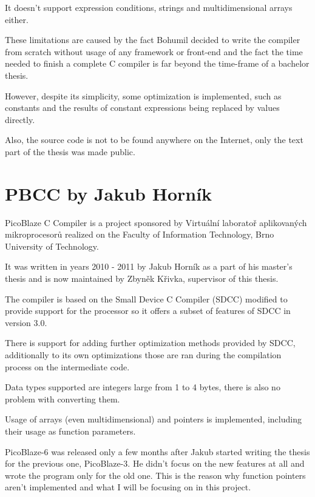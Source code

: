     It doesn't support expression conditions, strings and multidimensional arrays either.

    These limitations are caused by the fact Bohumil decided to write the compiler
    from scratch without usage of any framework or front-end and the fact the time needed to finish a complete C compiler is far beyond the time-frame of a bachelor thesis.

    However, despite its simplicity, some optimization is implemented, 
    such as constants and the results of constant expressions being replaced by values directly.

    Also, the source code is not to be found anywhere on the Internet, only the text part of the thesis was made public.


    \section{PBCC by Jakub Horník}\label{prev_pbcc}


    PicoBlaze C Compiler is a project sponsored by Virtuální laboratoř aplikovaných mikroprocesorů 
    realized on the Faculty of Information Technology, Brno University of Technology.

    It was written in years 2010 - 2011 by Jakub Horník as a part of his master's thesis and is now maintained by Zbyněk Křivka, supervisor of this thesis.

    The compiler is based on the Small Device C Compiler (SDCC) modified to provide support for the processor so it offers a subset of features of SDCC in version 3.0.

    There is support for adding further optimization methods provided by SDCC, additionally to its own optimizations those are ran during the compilation process on the intermediate code.

    Data types supported are integers large from 1 to 4 bytes, there is also no problem with converting them.

    Usage of arrays (even multidimensional) and pointers is implemented, including their usage as function parameters.

    PicoBlaze-6 was released only a few months after Jakub started writing the thesis for the previous one, PicoBlaze-3. 
    He didn't focus on the new features at all and wrote the program only for the old one.
    This is the reason why function pointers aren't implemented and what I will be focusing on in this project.

